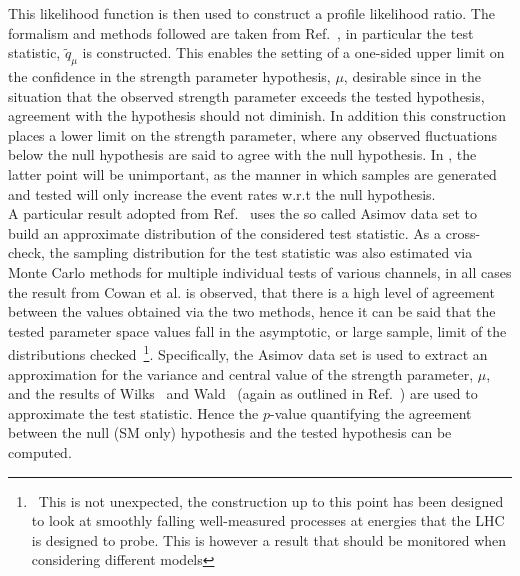 \documentclass[floatfix]{article}
\begin{document}
This likelihood function is then used to construct a profile likelihood ratio. The formalism and methods followed are taken from 
Ref.~\cite{Cowan:2010js}, in particular the test statistic, $\tilde{q}_{\mu}$ is constructed. This enables the setting of a one-sided upper limit on the confidence 
in the strength parameter hypothesis, $\mu$, desirable since in the situation that the observed strength parameter exceeds the tested hypothesis, agreement with 
the hypothesis should not diminish. In addition this construction places a lower limit on the strength parameter, where any observed fluctuations below the null 
hypothesis are said to agree with the null hypothesis. In \Contur, the latter point will be unimportant, as the manner in which samples are 
generated and tested will only increase the event rates w.r.t the null hypothesis. 
\\

A particular result adopted from Ref.~\cite{Cowan:2010js} uses the so called Asimov data set to build an approximate distribution of the considered test statistic. 
As a cross-check, the sampling distribution for the test statistic was also estimated via Monte Carlo methods for multiple individual tests of various channels, 
in all cases the result from Cowan et al. is observed, that there is a high level of agreement between the values obtained via the two methods, hence it can be said
that the tested parameter space values fall in the asymptotic, or large sample, limit of the distributions checked~\footnote{~This is not unexpected, the
construction up to this point has been designed to look at smoothly falling well-measured processes at energies that the LHC is designed to probe. This is however a 
result that should be monitored when considering different models}. Specifically, the Asimov data set is used to extract an approximation for the variance and central value of the strength parameter, $\mu$, and the results of Wilks~\cite{Wilks:1938dza} and Wald~\cite{Wald:1943:EWM} (again as outlined in Ref.~\cite{Cowan:2010js}) are used to approximate the test statistic. 
Hence the $p$-value quantifying the agreement between the null (SM only) hypothesis and the tested hypothesis can be computed. 
\\
\end{document}
